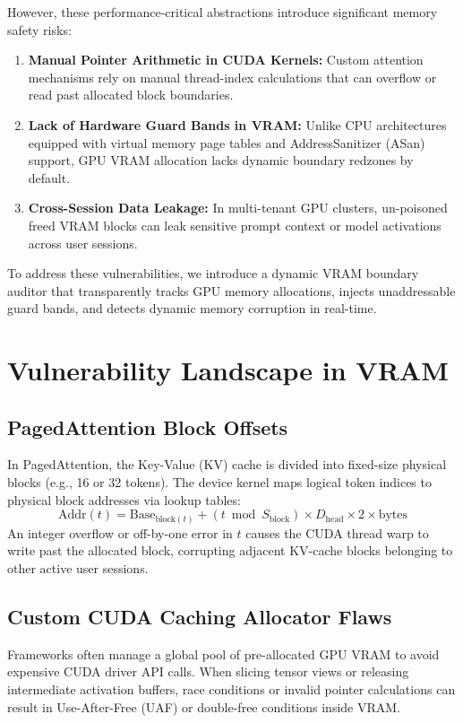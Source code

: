 \documentclass[10pt,twocolumn,a4paper]{article}
\begin{document}
However, these performance-critical abstractions introduce significant memory safety risks:
\begin{enumerate}
    \item \textbf{Manual Pointer Arithmetic in CUDA Kernels:} Custom attention mechanisms rely on manual thread-index calculations that can overflow or read past allocated block boundaries.
    \item \textbf{Lack of Hardware Guard Bands in VRAM:} Unlike CPU architectures equipped with virtual memory page tables and AddressSanitizer (ASan) support, GPU VRAM allocation lacks dynamic boundary redzones by default.
    \item \textbf{Cross-Session Data Leakage:} In multi-tenant GPU clusters, un-poisoned freed VRAM blocks can leak sensitive prompt context or model activations across user sessions.
\end{enumerate}

To address these vulnerabilities, we introduce a dynamic VRAM boundary auditor that transparently tracks GPU memory allocations, injects unaddressable guard bands, and detects dynamic memory corruption in real-time.

\section{Vulnerability Landscape in VRAM}

\subsection{PagedAttention Block Offsets}
In PagedAttention, the Key-Value (KV) cache is divided into fixed-size physical blocks (e.g., 16 or 32 tokens). The device kernel maps logical token indices to physical block addresses via lookup tables:
\begin{equation}
\text{Addr}(t) = \text{Base}_{\text{block}(t)} + \left( t \bmod S_{\text{block}} \right) \times D_{\text{head}} \times 2 \times \text{bytes}
\end{equation}
An integer overflow or off-by-one error in $t$ causes the CUDA thread warp to write past the allocated block, corrupting adjacent KV-cache blocks belonging to other active user sessions.

\subsection{Custom CUDA Caching Allocator Flaws}
Frameworks often manage a global pool of pre-allocated GPU VRAM to avoid expensive CUDA driver API calls. When slicing tensor views or releasing intermediate activation buffers, race conditions or invalid pointer calculations can result in Use-After-Free (UAF) or double-free conditions inside VRAM.
\end{document}
